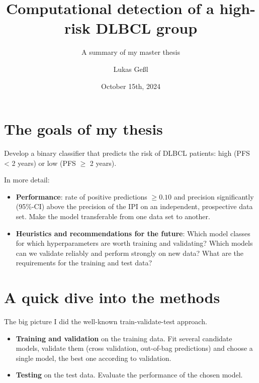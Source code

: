 \documentclass[10pt, aspectratio=169]{beamer}
\title{Computational detection of a high-risk DLBCL group}
\subtitle{A summary of my master thesis}
\date{October 15th, 2024}
\author{Lukas Geßl}
\institute{Chair of Statistical Bioinformatics, University of Regensburg}
\begin{document}
\maketitle

\section{The goals of my thesis}

\begin{frame}{}
  Develop a binary classifier that predicts the risk of DLBCL patients: high (PFS < 2 years) or low 
  (PFS $\geq$ 2 years). 

  In more detail:
  \begin{itemize}
    \item \textbf{Performance}: rate of positive predictions $\geq \num{0.10}$ and precision significantly 
      (\num{95}\%-CI) above the precision of the IPI on an independent, prospective data set. Make 
      the model transferable from one data set to another.
    \item \textbf{Heuristics and recommendations for the future}: Which model classes for which 
      hyperparameters are worth training and validating? Which models can we validate reliably and 
      perform strongly on new data? What are the requirements for the training and test data?
  \end{itemize}
\end{frame}

\section{A quick dive into the methods}

\begin{frame}{The big picture}
  I did the well-known train-validate-test approach.
  \begin{itemize}
    \item \textbf{Training and validation} on the training data. Fit several candidate models, 
      validate them (cross validation, out-of-bag predictions) and choose a single model, the best 
      one according to validation.
    \item \textbf{Testing} on the test data. Evaluate the performance of the chosen model.
  \end{itemize}
\end{frame}
\end{document}

